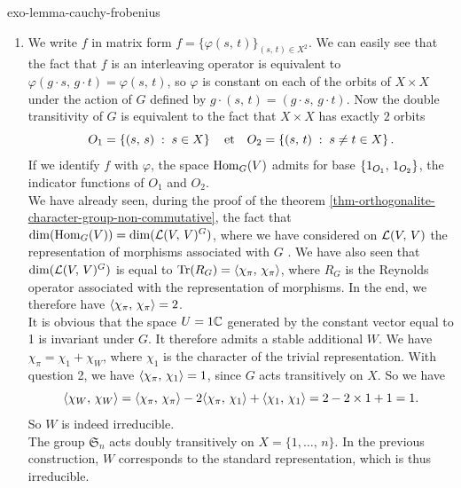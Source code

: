 \begin{correction}{exo-lemma-cauchy-frobenius}
\begin{enumerate}
\item {}   We write $ f $ in matrix form $ f = \{\varphi (s, \, t)\}_{(s, \, t) \in X^2} $. We can easily see that the fact that $ f $ is an interleaving operator is equivalent to $ \varphi (g \cdot s, \, g \cdot t) = \varphi (s, \, t) $, so $ \varphi $ is constant on each of the orbits of $ X \times X $ under the action of $ G $ defined by $ g \cdot (s, \, t) = (g \cdot s, \, g \cdot t) $. Now the double transitivity of $ G $ is equivalent to the fact that $ X \times X $ has exactly $ 2 $ orbits
\begin{equation*}
O_1 = \left\{ (s, \, s) \;:\; s \in X \right\} \quad \text{et} \quad O_2 = \left\{ (s, \, t) \;:\; s \neq t \in X \right\} .
\end{equation*}
If we identify $ f $ with $ \varphi $, the space $ \operatorname{Hom}_G (V) $ admits for base $ \{1_{O_1}, \, 1_{O_2}\} $, the indicator functions of $ O_1 $ and $ O_2 $. \\We have already seen, during the proof of the theorem \ref{thm-orthogonalite-character-group-non-commutative}, the fact that $ \dim (\operatorname{Hom}_G (V)) = \dim (\mathcal{L} (V, \, V)^G) $, where we have considered on $ \mathcal{L} (V, \, V) $ the representation of morphisms associated with $ G $ . We have also seen that $ \dim (\mathcal{L} (V, \, V)^G) $ is equal to $ \operatorname{Tr} (R_G) = \langle \chi_\pi,\,\chi_\pi\rangle $, where $ R_G $ is the Reynolds operator associated with the representation of morphisms. In the end, we therefore have $ \langle \chi_\pi,\,\chi_\pi\rangle = 2 $. \\It is obvious that the space $ U = 1 \mathbb{C} $ generated by the constant vector equal to 1 is invariant under $ G $. It therefore admits a stable additional $ W $. We have $ \chi_\pi = \chi_1 + \chi_W $, where $ \chi_1 $ is the character of the trivial representation. With question 2, we have $ \langle \chi_\pi,\,\chi_1\rangle = 1 $, since $ G $ acts transitively on $ X $. So we have
\begin{equation*}
\langle \chi_W,\,\chi_W\rangle = \langle \chi_\pi,\,\chi_\pi\rangle - 2 \langle \chi_\pi,\,\chi_1\rangle + \langle \chi_1,\,\chi_1\rangle = 2 - 2 \times 1+1 = 1.
\end{equation*}
So $ W $ is indeed irreducible. \\The group $ \mathfrak{S}_n $ acts doubly transitively on $ X = \{1, \ldots, \, n\} $. In the previous construction, $ W $ corresponds to the standard representation, which is thus irreducible.
\end{enumerate}
\end{correction}
 
